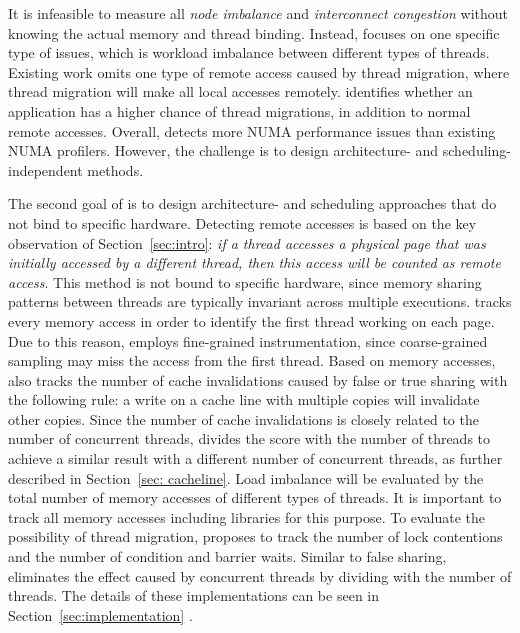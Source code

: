 It is infeasible to measure all \textit{node imbalance} and \textit{interconnect congestion} without knowing the actual memory and thread binding. Instead, \NP{} focuses on one specific type of issues, which is workload imbalance between different types of threads. 
Existing work omits one type of remote access caused by thread migration, where thread migration will make all local accesses remotely. 
\NP{} identifies whether an application has a higher chance of thread migrations, in addition to normal remote accesses. 
Overall, \NP{} detects more NUMA performance issues than existing NUMA profilers. However, the challenge is to design architecture- and scheduling-independent methods. 


The second goal of \NP{} is to design architecture- and scheduling approaches that do not bind to specific hardware. Detecting remote accesses is based on the key observation of Section~\ref{sec:intro}: \textit{if a thread accesses a physical page that was initially accessed by a different thread, then this access will be counted as remote access}. This method is not bound to specific hardware, since memory sharing patterns between threads are typically invariant across multiple executions. 
\NP{} tracks every memory access in order to identify the first thread working on each page. Due to this reason, \NP{} employs fine-grained instrumentation, since coarse-grained sampling may miss the access from the first thread. Based on memory accesses, \NP{} also tracks the number of cache invalidations caused by false or true sharing with the following rule: a write on a cache line with multiple copies will invalidate other copies. Since the number of cache invalidations is closely related to the number of concurrent threads, \NP{} divides the score with the number of threads to achieve a similar result with a different number of concurrent threads, as further described in Section~\ref{sec: cacheline}. Load imbalance will be evaluated by the total number of memory accesses of different types of threads. It is important to track all memory accesses including libraries for this purpose. To evaluate the possibility of thread migration, \NP{} proposes to track the number of lock contentions and the number of condition and barrier waits. Similar to false sharing, \NP{} eliminates the effect caused by concurrent threads by dividing with the number of threads. The details of these implementations can be seen in Section~\ref{sec:implementation} . 



